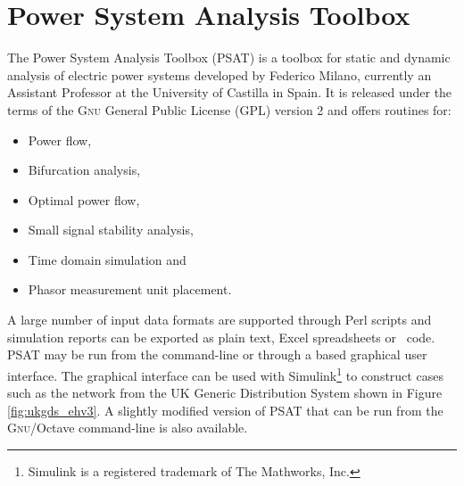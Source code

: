 \section{Power System Analysis Toolbox}
\label{sec:psat}
The Power System Analysis Toolbox (PSAT) is a \matlab toolbox for static and
dynamic analysis of electric power systems developed by Federico Milano,
currently an Assistant Professor at the University of Castilla in Spain. It is
released under the terms of the \textsc{Gnu} General Public License (GPL)
version 2 and offers routines for:
\begin{itemize}
	\item Power flow,
	\item Bifurcation analysis,
	\item Optimal power flow,
	\item Small signal stability analysis,
	\item Time domain simulation and
	\item Phasor measurement unit placement.
\end{itemize}
A large number of input data formats are supported through Perl scripts and
simulation reports can be exported as plain text, Excel spreadsheets or
\LaTeXe~code.  PSAT may be run from the \matlab command-line or through a
\matlab based graphical user interface.  The graphical interface can be used with
Simulink\footnote{Simulink is a registered trademark of The Mathworks, Inc.}
to construct cases such as the network from the UK Generic Distribution System
shown in Figure \ref{fig:ukgds_ehv3}.  A slightly modified version of PSAT that
can be run from the \textsc{Gnu}/Octave command-line is also available.


